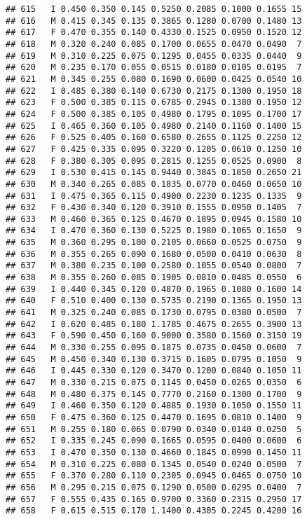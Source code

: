 \documentclass[
]{article}
\begin{document}
\begin{verbatim}
## 615   I 0.450 0.350 0.145 0.5250 0.2085 0.1000 0.1655 15
## 616   M 0.415 0.345 0.135 0.3865 0.1280 0.0700 0.1480 13
## 617   F 0.470 0.355 0.140 0.4330 0.1525 0.0950 0.1520 12
## 618   M 0.320 0.240 0.085 0.1700 0.0655 0.0470 0.0490  7
## 619   M 0.310 0.225 0.075 0.1295 0.0455 0.0335 0.0440  9
## 620   M 0.235 0.170 0.055 0.0515 0.0180 0.0105 0.0195  7
## 621   M 0.345 0.255 0.080 0.1690 0.0600 0.0425 0.0540 10
## 622   I 0.485 0.380 0.140 0.6730 0.2175 0.1300 0.1950 18
## 623   F 0.500 0.385 0.115 0.6785 0.2945 0.1380 0.1950 12
## 624   F 0.500 0.385 0.105 0.4980 0.1795 0.1095 0.1700 17
## 625   I 0.465 0.360 0.105 0.4980 0.2140 0.1160 0.1400 15
## 626   F 0.525 0.405 0.160 0.6580 0.2655 0.1125 0.2250 12
## 627   F 0.425 0.335 0.095 0.3220 0.1205 0.0610 0.1250 10
## 628   F 0.380 0.305 0.095 0.2815 0.1255 0.0525 0.0900  8
## 629   I 0.530 0.415 0.145 0.9440 0.3845 0.1850 0.2650 21
## 630   M 0.340 0.265 0.085 0.1835 0.0770 0.0460 0.0650 10
## 631   I 0.475 0.365 0.115 0.4900 0.2230 0.1235 0.1335  9
## 632   F 0.430 0.340 0.120 0.3910 0.1555 0.0950 0.1405  7
## 633   M 0.460 0.365 0.125 0.4670 0.1895 0.0945 0.1580 10
## 634   I 0.470 0.360 0.130 0.5225 0.1980 0.1065 0.1650  9
## 635   M 0.360 0.295 0.100 0.2105 0.0660 0.0525 0.0750  9
## 636   M 0.355 0.265 0.090 0.1680 0.0500 0.0410 0.0630  8
## 637   M 0.380 0.235 0.100 0.2580 0.1055 0.0540 0.0800  7
## 638   M 0.355 0.260 0.085 0.1905 0.0810 0.0485 0.0550  6
## 639   I 0.440 0.345 0.120 0.4870 0.1965 0.1080 0.1600 14
## 640   F 0.510 0.400 0.130 0.5735 0.2190 0.1365 0.1950 13
## 641   M 0.325 0.240 0.085 0.1730 0.0795 0.0380 0.0500  7
## 642   I 0.620 0.485 0.180 1.1785 0.4675 0.2655 0.3900 13
## 643   F 0.590 0.450 0.160 0.9000 0.3580 0.1560 0.3150 19
## 644   M 0.330 0.255 0.095 0.1875 0.0735 0.0450 0.0600  7
## 645   M 0.450 0.340 0.130 0.3715 0.1605 0.0795 0.1050  9
## 646   I 0.445 0.330 0.120 0.3470 0.1200 0.0840 0.1050 11
## 647   M 0.330 0.215 0.075 0.1145 0.0450 0.0265 0.0350  6
## 648   M 0.480 0.375 0.145 0.7770 0.2160 0.1300 0.1700  9
## 649   I 0.460 0.350 0.120 0.4885 0.1930 0.1050 0.1550 11
## 650   F 0.475 0.360 0.125 0.4470 0.1695 0.0810 0.1400  9
## 651   M 0.255 0.180 0.065 0.0790 0.0340 0.0140 0.0250  5
## 652   I 0.335 0.245 0.090 0.1665 0.0595 0.0400 0.0600  6
## 653   I 0.470 0.350 0.130 0.4660 0.1845 0.0990 0.1450 11
## 654   M 0.310 0.225 0.080 0.1345 0.0540 0.0240 0.0500  7
## 655   F 0.370 0.280 0.110 0.2305 0.0945 0.0465 0.0750 10
## 656   M 0.295 0.215 0.075 0.1290 0.0500 0.0295 0.0400  7
## 657   F 0.555 0.435 0.165 0.9700 0.3360 0.2315 0.2950 17
## 658   F 0.615 0.515 0.170 1.1400 0.4305 0.2245 0.4200 16

\end{verbatim}
\end{document}
